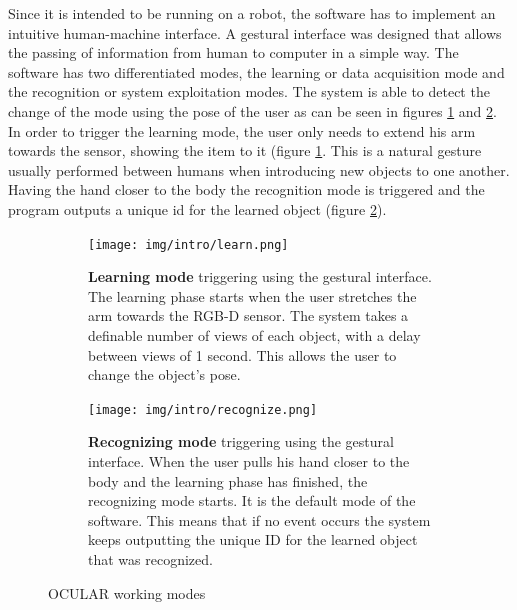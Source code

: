 Since it is intended to be running on a robot, the software has to implement an intuitive human-machine interface. 
A gestural interface was designed that allows the passing of information from human to computer in a simple way. 
The software has two differentiated modes, the learning or data acquisition mode and the recognition or system exploitation modes. 
The system is able to detect the change of the mode using the pose of the user as can be seen in figures \ref{learn} and \ref{recognize}. 
In order to trigger the learning mode, the user only needs to extend his arm towards the sensor, showing the item to it (figure \ref{learn}. 
This is a natural gesture usually performed between humans when introducing new objects to one another. 
Having the hand closer to the body the recognition mode is triggered and the program outputs a unique id for the learned object (figure \ref{recognize}). 




	
\begin{figure}[H]
   \centering
   \begin{subfigure}[H]{0.45\textwidth}
       \centering
		\texttt{[image: img/intro/learn.png]}
		\caption[Learning Mode Triggering]{\textbf{Learning mode} triggering using the gestural interface. The learning phase starts when the user stretches the arm towards the RGB-D sensor. The system takes a definable number of views of each object, with a delay between views of 1 second. This allows the user to change the object's pose. }    	 
		\label{learn}
   \end{subfigure}
   \hfill
   \begin{subfigure}[H]{0.45\textwidth}
       \centering
    	\texttt{[image: img/intro/recognize.png]}
		\caption[Recognizing Mode Triggering]{\textbf{Recognizing mode} triggering using the gestural interface. When the user pulls his hand closer to the body and the learning phase has finished, the recognizing mode starts. It is the default mode of the software. This means that if no event occurs the system keeps outputting the unique ID for the learned object that was recognized. }      
		\label{recognize}

   \end{subfigure}
   \caption{OCULAR working modes}
   \label{}
\end{figure}






